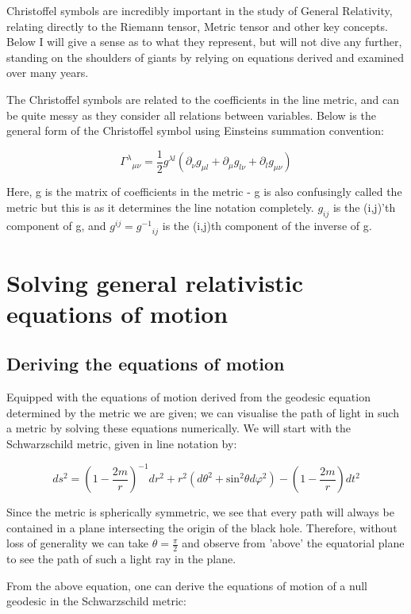 \documentclass[oneside,openright,frontopenright]{dmathesis}
\begin{document}
	Christoffel symbols are incredibly important in the study of General Relativity, relating directly to the Riemann tensor, Metric tensor and other key concepts. Below I will give a sense as to what they represent, but will not dive any further, standing on the shoulders of giants by relying on equations derived and examined over many years.

	The Christoffel symbols are related to the coefficients in the line metric, and can be quite messy as they consider all relations between variables. Below is the general form of the Christoffel symbol using Einsteins summation convention\cite{albert1916foundation}:
	
	\[{\Gamma^\lambda}_{\mu\nu} = \frac{1}{2}g^{\lambda{l}}(\partial_{\nu}g_{\mu{l}} + \partial_{\mu}g_{l\nu} + \partial_{l}g_{\mu\nu})\]
	
	Here, g is the matrix of coefficients in the metric - g is also confusingly called the metric but this is as it determines the line notation completely. $g_{ij}$ is the (i,j)'th component of g, and $g^{ij} = {g^{-1}}_{ij}$ is the (i,j)th component of the inverse of g.

\chapter{Solving general relativistic equations of motion}
\section{Deriving the equations of motion}
	Equipped with the equations of motion derived from the geodesic equation determined by the metric we are given; we can visualise the path of light in such a metric by solving these equations numerically. We will start with the Schwarzschild metric, given in line notation by\cite{derivationSchwarzschild}: 


	\[{ds^{2} = {\left(1-\frac {2m}{r}\right)}^{-1}} {dr^2} + {r^2}({d\theta ^2} + {\mbox{sin} ^2}{\theta}{d\varphi ^2}) -{\left(1-\frac {2m}{r}\right)}{dt^2}\]


	Since the metric is spherically symmetric, we see that every path will always be contained in a plane intersecting the origin of the black hole. Therefore, without loss of generality we can take ${\theta}=\frac{\pi}{2}$ and observe from 'above’ the equatorial plane to see the path of such a light ray in the plane.

	From the above equation, one can derive the equations of motion of a null geodesic in the Schwarzschild metric:
\end{document}
